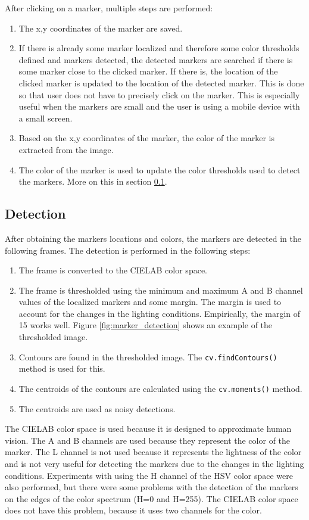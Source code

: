 After clicking on a marker, multiple steps are performed:
\begin{enumerate}
    \item The x,y coordinates of the marker are saved.
    \item If there is already some marker localized and therefore some color thresholds defined and markers detected, the detected markers are searched if there is some marker close to the clicked marker. If there is, the location of the clicked marker is updated to the location of the detected marker. This is done so that user does not have to precisely click on the marker. This is especially useful when the markers are small and the user is using a mobile device with a small screen.
    \item Based on the x,y coordinates of the marker, the color of the marker is extracted from the image.
    \item The color of the marker is used to update the color thresholds used to detect the markers. More on this in section \ref{detection}.
\end{enumerate}

\subsection{Detection}
\label{detection}
After obtaining the markers locations and colors, the markers are detected in the following frames. The detection is performed in the following steps:
\begin{enumerate}
    \item The frame is converted to the CIELAB color space.
    \item The frame is thresholded using the minimum and maximum A and B channel values of the localized markers and some margin. The margin is used to account for the changes in the lighting conditions. Empirically, the margin of 15 works well. Figure \ref{fig:marker_detection} shows an example of the thresholded image.
    \item Contours are found in the thresholded image. The \texttt{cv.findContours()} method is used for this.
    \item The centroids of the contours are calculated using the \texttt{cv.moments()} method.
    \item The centroids are used as noisy detections.
\end{enumerate}

The CIELAB color space is used because it is designed to approximate human vision. The A and B channels are used because they represent the color of the marker. The L channel is not used because it represents the lightness of the color and is not very useful for detecting the markers due to the changes in the lighting conditions. Experiments with using the H channel of the HSV color space were also performed, but there were some problems with the detection of the markers on the edges of the color spectrum (H=0 and H=255). The CIELAB color space does not have this problem, because it uses two channels for the color.

